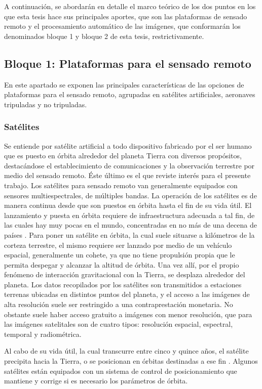 A continuación, se abordarán en detalle el marco teórico de los dos puntos en los que esta tesis hace sus principales aportes, que son las plataformas de sensado remoto y el procesamiento automático de las imágenes, que conformarán los denominados bloque 1 y bloque 2 de esta tesis, restrictivamente.

\subsection{Bloque 1: Plataformas para el sensado remoto}
En este apartado se exponen las principales características de las opciones de plataformas para el sensado remoto, agrupadas en satélites artificiales, aeronaves tripuladas y no tripuladas.
\subsubsection{Satélites}

Se entiende por satélite artificial a todo dispositivo fabricado por el ser humano que es puesto en órbita alrededor del planeta Tierra con diversos propósitos, destacándose el establecimiento de comunicaciones y la observación terrestre por medio del sensado remoto. Éste último es el que reviste interés para el presente trabajo. Los satélites para sensado remoto van generalmente equipados con sensores multiespectrales, de múltiples bandas. La operación de los satélites es de manera continua desde que son puestos en órbita hasta el fin de su vida útil. El lanzamiento y puesta en órbita requiere de infraestructura adecuada a tal fin, de las cuales hay muy pocas en el mundo, concentradas en no más de una decena de países \cite{noauthor_que_nodate}. Para poner un satélite en órbita, la cual suele situarse a kilómetros de la corteza terrestre, el mismo requiere ser lanzado por medio de un vehículo espacial, generalmente un cohete, ya que no tiene propulsión propia que le permita despegar y alcanzar la altitud de órbita. Una vez allí, por el propio fenómeno de interacción gravitacional con la Tierra, se desplaza alrededor del planeta.
Los datos recopilados por los satélites son transmitidos a estaciones terrenas ubicadas en distintos puntos del planeta, y el acceso a las imágenes de alta resolución suele ser restringido a una contraprestación monetaria. No obstante suele haber acceso gratuito a imágenes con menor resolución, que para las imágenes satelitales son de cuatro tipos: resolución espacial, espectral, temporal y radiométrica.

Al cabo de su vida útil, la cual transcurre entre cinco y quince años, el satélite precipita hacia la Tierra, o se posicionan en órbitas destinadas a ese fin \cite{noauthor_keeping_nodate}. Algunos satélites están equipados con un sistema de control de posicionamiento que mantiene y corrige si es necesario los parámetros de órbita.

